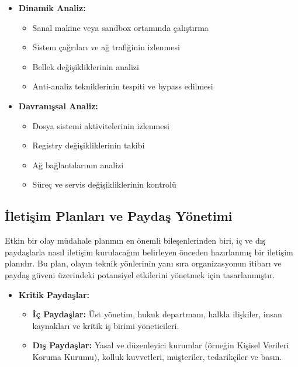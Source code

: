 \begin{itemize}
\begin{itemize}
\begin{itemize}
    \item \textbf{Dinamik Analiz:}
    \begin{itemize}
        \item Sanal makine veya sandbox ortamında çalıştırma
        \item Sistem çağrıları ve ağ trafiğinin izlenmesi
        \item Bellek değişikliklerinin analizi
        \item Anti-analiz tekniklerinin tespiti ve bypass edilmesi
    \end{itemize}

    \item \textbf{Davranışsal Analiz:}
    \begin{itemize}
        \item Dosya sistemi aktivitelerinin izlenmesi
        \item Registry değişikliklerinin takibi
        \item Ağ bağlantılarının analizi
        \item Süreç ve servis değişikliklerinin kontrolü
    \end{itemize}
\end{itemize}

\subsection{İletişim Planları ve Paydaş Yönetimi}

Etkin bir olay müdahale planının en önemli bileşenlerinden biri, iç ve dış paydaşlarla nasıl iletişim kurulacağını belirleyen önceden hazırlanmış bir iletişim planıdır. Bu plan, olayın teknik yönlerinin yanı sıra organizasyonun itibarı ve paydaş güveni üzerindeki potansiyel etkilerini yönetmek için tasarlanmıştır.

\begin{itemize}
    \item \textbf{Kritik Paydaşlar:}
    \begin{itemize}
        \item \textbf{İç Paydaşlar:} Üst yönetim, hukuk departmanı, halkla ilişkiler, insan kaynakları ve kritik iş birimi yöneticileri.
        \item \textbf{Dış Paydaşlar:} Yasal ve düzenleyici kurumlar (örneğin Kişisel Verileri Koruma Kurumu), kolluk kuvvetleri, müşteriler, tedarikçiler ve basın.
    \end{itemize}
\end{itemize}


\end{itemize}
\end{itemize}

